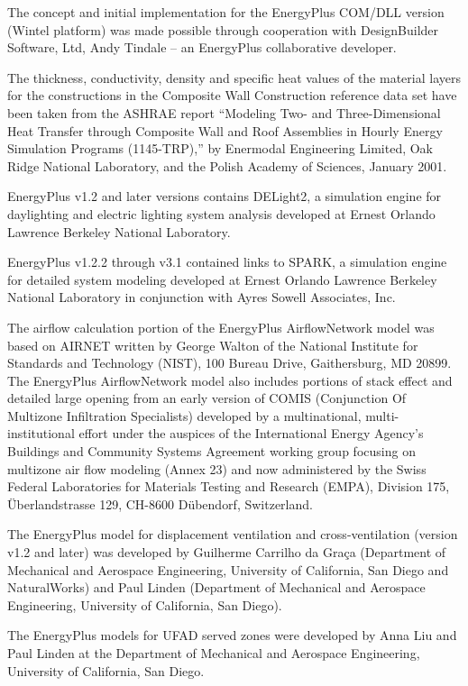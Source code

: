 The concept and initial implementation for the EnergyPlus COM/DLL version (Wintel platform) was made possible through cooperation with DesignBuilder Software, Ltd, Andy Tindale -- an EnergyPlus collaborative developer.

The thickness, conductivity, density and specific heat values of the material layers for the constructions in the Composite Wall Construction reference data set have been taken from the ASHRAE report ``Modeling Two- and Three-Dimensional Heat Transfer through Composite Wall and Roof Assemblies in Hourly Energy Simulation Programs (1145-TRP),'' by Enermodal Engineering Limited, Oak Ridge National Laboratory, and the Polish Academy of Sciences, January 2001.

EnergyPlus v1.2 and later versions contains DELight2, a simulation engine for daylighting and electric lighting system analysis developed at Ernest Orlando Lawrence Berkeley National Laboratory.

EnergyPlus v1.2.2 through v3.1 contained links to SPARK, a simulation engine for detailed system modeling developed at Ernest Orlando Lawrence Berkeley National Laboratory in conjunction with Ayres Sowell Associates, Inc.

The airflow calculation portion of the EnergyPlus AirflowNetwork model was based on AIRNET written by George Walton of the National Institute for Standards and Technology (NIST), 100 Bureau Drive, Gaithersburg, MD 20899. The EnergyPlus AirflowNetwork model also includes portions of stack effect and detailed large opening from an early version of COMIS (Conjunction Of Multizone Infiltration Specialists) developed by a multinational, multi-institutional effort under the auspices of the International Energy Agency's Buildings and Community Systems Agreement working group focusing on multizone air flow modeling (Annex 23) and now administered by the Swiss Federal Laboratories for Materials Testing and Research (EMPA), Division 175, Überlandstrasse 129, CH-8600 Dübendorf, Switzerland.

The EnergyPlus model for displacement ventilation and cross-ventilation (version v1.2 and later) was developed by Guilherme Carrilho da Graça (Department of Mechanical and Aerospace Engineering, University of California, San Diego and NaturalWorks) and Paul Linden (Department of Mechanical and Aerospace Engineering, University of California, San Diego).

The EnergyPlus models for UFAD served zones were developed by Anna Liu and Paul Linden at the Department of Mechanical and Aerospace Engineering, University of California, San Diego.

